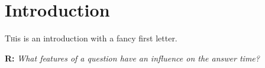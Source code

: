 \section{Introduction}
\label{sec:intro}

\lettrine[nindent=0em,lines=3]{T}his is an introduction with a fancy first letter. \blindtext

\begin{displayquote}
    \textbf{R:} \emph{What features of a question have an influence on the answer time?}
\end{displayquote}

\blindtext
